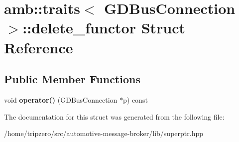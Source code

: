 \hypertarget{structamb_1_1traits_3_01GDBusConnection_01_4_1_1delete__functor}{\section{amb\-:\-:traits$<$ G\-D\-Bus\-Connection $>$\-:\-:delete\-\_\-functor Struct Reference}
\label{structamb_1_1traits_3_01GDBusConnection_01_4_1_1delete__functor}
}
\subsection*{Public Member Functions}
\begin{DoxyCompactItemize}
\item 
\hypertarget{structamb_1_1traits_3_01GDBusConnection_01_4_1_1delete__functor_a3f966a938e963a04abbde58f40aa2b62}{void {\bfseries operator()} (G\-D\-Bus\-Connection $\ast$p) const }\label{structamb_1_1traits_3_01GDBusConnection_01_4_1_1delete__functor_a3f966a938e963a04abbde58f40aa2b62}

\end{DoxyCompactItemize}


The documentation for this struct was generated from the following file\-:\begin{DoxyCompactItemize}
\item 
/home/tripzero/src/automotive-\/message-\/broker/lib/superptr.\-hpp\end{DoxyCompactItemize}
